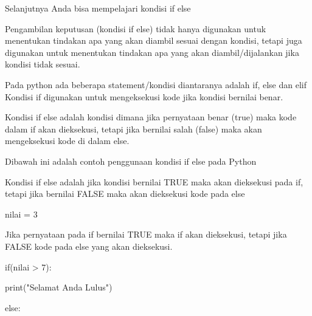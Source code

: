\noindent 
\vspace{\baselineskip}
Selanjutnya Anda bisa mempelajari kondisi if else \par
\vspace{12pt}
\noindent 
Pengambilan keputusan (kondisi if else) tidak hanya digunakan untuk menentukan tindakan apa yang akan diambil sesuai dengan kondisi, tetapi juga digunakan untuk menentukan tindakan apa yang akan diambil/dijalankan jika kondisi tidak sesuai.\vspace{\baselineskip}
\vspace{\baselineskip}
 \par
\noindent 
Pada python ada beberapa statement/kondisi diantaranya adalah $  $if, $  $else $  $dan $  $elif $  $Kondisi $  $if $  $digunakan untuk mengeksekusi kode jika kondisi bernilai benar.\vspace{\baselineskip}
\vspace{\baselineskip}
 \par
\noindent 
Kondisi if else adalah kondisi dimana jika pernyataan benar (true) maka kode dalam if akan dieksekusi, tetapi jika bernilai salah (false) maka akan mengeksekusi kode di dalam else.\vspace{\baselineskip}
\vspace{\baselineskip}
 \par
\noindent 
Dibawah ini adalah contoh penggunaan kondisi if else pada Python \par
\vspace{12pt}
\noindent 
Kondisi if else adalah jika kondisi bernilai TRUE maka akan dieksekusi pada if, tetapi jika bernilai FALSE maka akan dieksekusi kode pada else \par
\noindent 
\vspace{\baselineskip}
nilai = 3\vspace{\baselineskip}
 \par
\noindent 
Jika pernyataan pada if bernilai TRUE maka if akan dieksekusi, tetapi jika FALSE kode pada else yang akan dieksekusi.\vspace{\baselineskip}
 \par
\noindent 
if(nilai > 7):\vspace{\baselineskip}
 $  $  $  $ \par
\noindent 
 print("Selamat Anda Lulus")\vspace{\baselineskip}
 \par
\noindent 
else:\vspace{\baselineskip}
 \par
\noindent 
